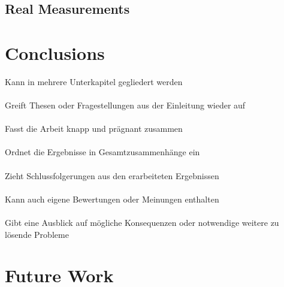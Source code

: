 \documentclass[11pt,oneside,openright]{mpreport}
\begin{document}
\section{Real Measurements}
\chapter{Conclusions}
Kann in mehrere Unterkapitel gegliedert werden\\\\
Greift Thesen oder Fragestellungen aus der Einleitung wieder auf\\\\
Fasst die Arbeit knapp und prägnant zusammen\\\\
Ordnet die Ergebnisse in Gesamtzusammenhänge ein\\\\
Zieht Schlussfolgerungen aus den erarbeiteten Ergebnissen\\\\
Kann auch eigene Bewertungen oder Meinungen enthalten\\\\
Gibt eine Ausblick auf mögliche Konsequenzen oder notwendige weitere zu lösende Probleme
\chapter{Future Work}

\printbibliography
\end{document}
